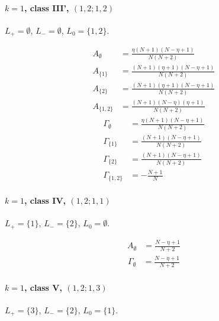 \documentclass[11pt]{article}
\begin{document}
\paragraph{$k=1$, class III', $(1,2;1,2)$}

$L_+=\emptyset$, $L_-=\emptyset$, $L_0=\{1,2\}$.

\begin{align*}
  A_{\emptyset} &= \frac{\eta \left(N + 1\right) \left(N - \eta + 1\right)}{N \left(N + 2\right)} \\
  A_{\{1\}} &= \frac{\left(N + 1\right) \left(\eta + 1\right) \left(N - \eta + 1\right)}{N \left(N + 2\right)} \\
  A_{\{2\}} &= \frac{\left(N + 1\right) \left(\eta + 1\right) \left(N - \eta + 1\right)}{N \left(N + 2\right)} \\
  A_{\{1,2\}} &= \frac{\left(N + 1\right) \left(N - \eta\right) \left(\eta + 1\right)}{N \left(N + 2\right)} 
\end{align*}
\begin{align*}
  \Gamma_{\emptyset} &= \frac{\eta \left(N + 1\right) \left(N - \eta + 1\right)}{N \left(N + 2\right)} \\
  \Gamma_{\{1\}} &= \frac{\left(N + 1\right) \left(N - \eta + 1\right)}{N \left(N + 2\right)} \\
  \Gamma_{\{2\}} &= \frac{\left(N + 1\right) \left(N - \eta + 1\right)}{N \left(N + 2\right)} \\
  \Gamma_{\{1,2\}} &= - \frac{N + 1}{N} 
\end{align*}

\paragraph{$k=1$, class IV, $(1,2;1,1)$}

$L_+=\{1\}$, $L_-=\{2\}$, $L_0=\emptyset$.

\begin{align*}
  A_{\emptyset} &= \frac{N - \eta + 1}{N + 2} 
\end{align*}
\begin{align*}
  \Gamma_{\emptyset} &= \frac{N - \eta + 1}{N + 2} 
\end{align*}

\paragraph{$k=1$, class V, $(1,2;1,3)$}

$L_+=\{3\}$, $L_-=\{2\}$, $L_0=\{1\}$.
\end{document}
